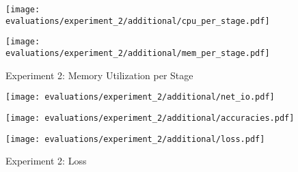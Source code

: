 \begin{figure}[p]
    \begin{adjustwidth}{-0.2\paperwidth}{-0.2\paperwidth}
        \centering
        \texttt{[image: evaluations/experiment\_2/additional/cpu\_per\_stage.pdf]}
        \caption{Experiment 2: CPU Utilization per Stage}
        \label{fig:eval_2_cpu_per_stage}
    \end{adjustwidth}

    \begin{adjustwidth}{-0.2\paperwidth}{-0.2\paperwidth}
        \centering
        \texttt{[image: evaluations/experiment\_2/additional/mem\_per\_stage.pdf]}
        \caption{Experiment 2: Memory Utilization per Stage}
        \label{fig:eval_2_memory_per_stage}
    \end{adjustwidth}
\end{figure}

\begin{figure}[p]
    \centering
    \begin{adjustwidth}{-0.2\paperwidth}{-0.2\paperwidth}
        \centering
        \texttt{[image: evaluations/experiment\_2/additional/net\_io.pdf]}
        \caption{Experiment 2: Network-IO}
        \label{fig:eval_2_net_io}
    \end{adjustwidth}

        \texttt{[image: evaluations/experiment\_2/additional/accuracies.pdf]}
        \caption{Experiment 2: Accuracies}
        \label{fig:eval_2_accuracies}

        \texttt{[image: evaluations/experiment\_2/additional/loss.pdf]}
        \caption{Experiment 2: Loss}
        \label{fig:eval_2_loss}
\end{figure}


